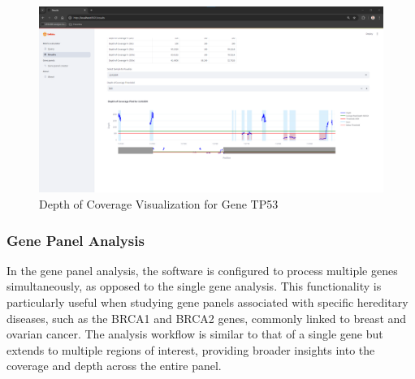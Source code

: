 \begin{itemize}
    \begin{figure}[H]
        \centering
        \includegraphics[width=\textwidth]{figs/v3.5.png}
        \caption{Depth of Coverage Visualization for Gene TP53}
        \label{fig:coverage_plot}
    \end{figure}
\end{itemize}

\subsubsection{\textbf{Gene Panel Analysis}}


In the gene panel analysis, the software is configured to process multiple genes simultaneously, as opposed to the single gene analysis. This functionality is particularly useful when studying gene panels associated with specific hereditary diseases, such as the BRCA1 and BRCA2 genes, commonly linked to breast and ovarian cancer. The analysis workflow is similar to that of a single gene but extends to multiple regions of interest, providing broader insights into the coverage and depth across the entire panel.

